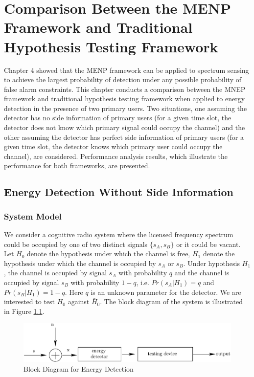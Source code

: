 \chapter{Comparison Between the MENP Framework and Traditional Hypothesis Testing Framework}
Chapter 4 showed that the MENP framework can be applied to spectrum sensing to achieve the largest probability of detection under any possible probability of false alarm constraints. This chapter conducts a comparison between the MNEP framework and traditional hypothesis testing framework when applied to energy detection in the presence of two primary users. Two situations, one assuming the detector has no side information of primary users (for a given time slot, the detector does not know which primary signal could occupy the channel) and the other assuming the detector has perfect side information of primary users (for a given time slot, the detector knows which primary user could occupy the channel), are considered.  
Performance analysis results, which illustrate the performance for both frameworks, are presented.

\section{Energy Detection Without Side Information}
\subsection{System Model}
We consider a cognitive radio system where the licensed frequency spectrum could be occupied by one of two distinct signals $\{s_A, s_B\}$ or it could be vacant. 
Let $H_0$ denote the hypothesis under which the channel is free, $H_1$ denote the hypothesis under which the channel is occupied by $s_A$ or $s_B$.
Under hypothesis $H_1$, the channel is occupied by signal $s_A$ with probability $q$ and the channel is occupied by signal $s_B$ with probability $1-q$, i.e. $Pr(s_A|H_1) = q$ and  $Pr(s_B|H_1) = 1-q$. Here $q$ is an unknown parameter for the detector. 
We are interested to test $H_0$ against $\bar{H}_0$. The block diagram of the system is illustrated in Figure \ref{pic: ch5 diagram}.  

\begin{figure}[!hbp]
\centering
\includegraphics[width = \textwidth]{5/fig4.eps}
\caption{Block Diagram for Energy Detection}
\label{pic: ch5 diagram}
\end{figure}

